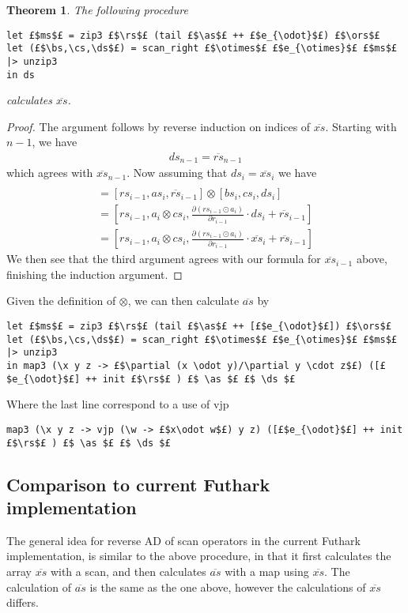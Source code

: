 \documentclass{article}
\newtheorem{theorem}{Theorem}
\newcommand{\ors}{\overline{rs}}
\newcommand{\rs}{rs}
\newcommand{\oas}{\overline{as}}
\newcommand{\xo}{\overline{xs}}
\newcommand{\as}{as}
\newcommand{\bs}{bs}
\newcommand{\cs}{cs}
\newcommand{\ds}{ds}
\begin{document}
\begin{theorem}
	The following procedure
	\begin{verbatim}
let £$ms$£ = zip3 £$\rs$£ (tail £$\as$£ ++ £$e_{\odot}$£) £$\ors$£
let (£$\bs,\cs,\ds$£) = scan_right £$\otimes$£ £$e_{\otimes}$£ £$ms$£ |> unzip3
in ds
\end{verbatim}
	calculates \(\xo\).
\end{theorem}
\begin{proof}
	The argument follows by reverse induction on indices of \(\xo\).
	Starting with \(n-1\), we have
	\begin{align*}
		\ds_{n-1} = \ors_{n-1}
	\end{align*}
	which agrees with  \(\xo_{n-1}\).
	Now assuming that \(\ds_{i} = \xo_{i}\) we have
	\begin{align*}
		[\bs_{i-1}, \cs_{i-1}, \ds_{i-1}] \\
		= [\rs_{i-1}, \as_{i}, \ors_{i-1}]\otimes
		[\bs_{i}, \cs_{i}, \ds_{i}]       \\
		= \left[\rs_{i-1}, a_{i} \otimes \cs_{i},
			\frac{\partial (rs_{i-1} \odot a_{i})}{\partial r_{i-1}} \cdot \ds_{i} + \ors_{i-1}
		\right]                           \\
		= \left[\rs_{i-1}, a_{i} \otimes \cs_{i},
			\frac{\partial (rs_{i-1} \odot a_{i})}{\partial r_{i-1}} \cdot \xo_{i} + \ors_{i-1}
			\right]
	\end{align*}
	We then see that the third argument agrees with our formula for
	\(\xo_{i-1}\) above, finishing the induction argument.
\end{proof}
Given the definition of \(\otimes \), we can then calculate \(\oas\) by
\begin{verbatim}
let £$ms$£ = zip3 £$\rs$£ (tail £$\as$£ ++ [£$e_{\odot}$£]) £$\ors$£
let (£$\bs,\cs,\ds$£) = scan_right £$\otimes$£ £$e_{\otimes}$£ £$ms$£ |> unzip3
in map3 (\x y z -> £$\partial (x \odot y)/\partial y \cdot z$£) ([£$e_{\odot}$£] ++ init £$\rs$£ ) £$ \as $£ £$ \ds $£
\end{verbatim}
Where the last line correspond to a use of vjp
\begin{verbatim}
map3 (\x y z -> vjp (\w -> £$x\odot w$£) y z) ([£$e_{\odot}$£] ++ init £$\rs$£ ) £$ \as $£ £$ \ds $£
\end{verbatim}
\subsection{Comparison to current Futhark implementation}
The general idea for reverse AD of scan operators in the current Futhark
implementation,
is similar to the above procedure,
in that it first calculates the array \(\xo\) with a scan,
and then calculates \(\oas\) with a map using \(\xo\).
The calculation of \(\oas\) is the same as the one above,
however the calculations of \(\xo\) differs.
\end{document}
